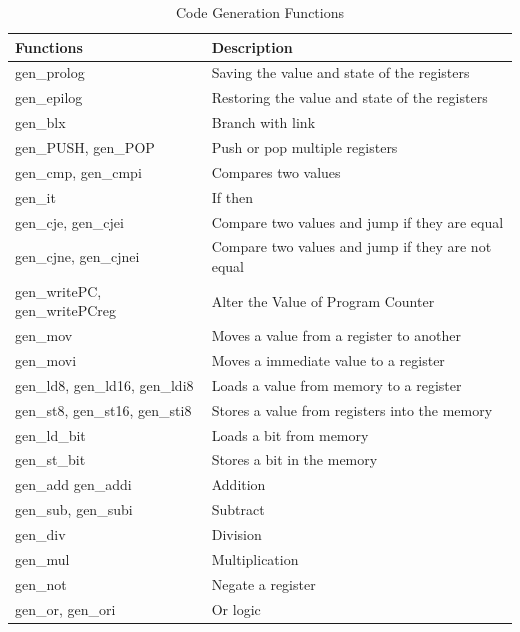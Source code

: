 \documentclass[11pt]{report}
\begin{document}
	\begin{table}[H]
		\caption{Code Generation Functions}
		\label{IRTable}
		\centering
		\begin{tabular}{|l|p{10cm}|}
			\hline
			\rowcolor[HTML]{C0B0C1} 
			\textbf{Functions}	    		  &	\textbf{Description}\\ \hline
			gen\_prolog			    		  &	Saving the value and state of the registers \\ \hline 
			gen\_epilog			    		  &	Restoring the value and state of the registers \\ \hline 
			gen\_blx		    	          &	Branch with link \\ \hline 
			gen\_PUSH, gen\_POP               &	Push or pop multiple registers \\ \hline 
			gen\_cmp, gen\_cmpi 	          &	Compares two values\\ \hline 
			gen\_it					          & If then	\\ \hline 
			gen\_cje, gen\_cjei 	          & Compare two values and jump if they are equal	\\ \hline 
			gen\_cjne, gen\_cjnei		      & Compare two values and jump if they are not equal	\\ \hline 
			gen\_writePC, gen\_writePCreg     & Alter the Value of Program Counter\\ \hline 
			gen\_mov 					      & Moves a value from a register to another\\ \hline 
			gen\_movi 						  & Moves a immediate value to a register \\ \hline
			gen\_ld8, gen\_ld16, gen\_ldi8	  & Loads a value from memory to a register\\ \hline 
			gen\_st8, gen\_st16, gen\_sti8    &	Stores a value from registers into the memory\\ \hline 
			gen\_ld\_bit                      &	Loads a bit from memory\\ \hline 
			gen\_st\_bit                      &	Stores a bit in the memory\\ \hline 
			gen\_add gen\_addi				  &	Addition \\ \hline 
			gen\_sub, gen\_subi				  &	Subtract \\ \hline 
			gen\_div						  &	Division \\ \hline 
			gen\_mul					      &	Multiplication \\ \hline 
			gen\_not						  &	Negate a register\\ \hline 
			gen\_or, gen\_ori				  &	Or logic \\ \hline 

\end{tabular}
\end{table}
\end{document}
